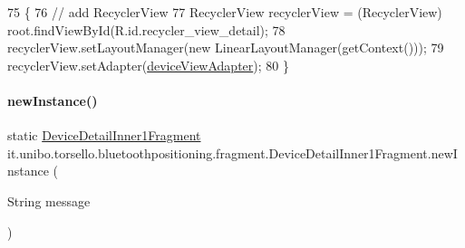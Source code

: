 \begin{DoxyCode}
75                                                    \{
76         \textcolor{comment}{// add RecyclerView}
77         RecyclerView recyclerView = (RecyclerView) root.findViewById(R.id.recycler\_view\_detail);
78         recyclerView.setLayoutManager(\textcolor{keyword}{new} LinearLayoutManager(getContext()));
79         recyclerView.setAdapter(\hyperlink{classit_1_1unibo_1_1torsello_1_1bluetoothpositioning_1_1fragment_1_1DeviceDetailInner1Fragment_ac96cc01fc4f531a4cb38a31cf56e81e9_ac96cc01fc4f531a4cb38a31cf56e81e9}{deviceViewAdapter});
80     \}
\end{DoxyCode}
\hypertarget{classit_1_1unibo_1_1torsello_1_1bluetoothpositioning_1_1fragment_1_1DeviceDetailInner1Fragment_a24fbb536786e1e87e8621b126bd27507_a24fbb536786e1e87e8621b126bd27507}{}\label{classit_1_1unibo_1_1torsello_1_1bluetoothpositioning_1_1fragment_1_1DeviceDetailInner1Fragment_a24fbb536786e1e87e8621b126bd27507_a24fbb536786e1e87e8621b126bd27507} 
\paragraph{\texorpdfstring{new\+Instance()}{newInstance()}}
{\footnotesize\ttfamily static \hyperlink{classit_1_1unibo_1_1torsello_1_1bluetoothpositioning_1_1fragment_1_1DeviceDetailInner1Fragment}{Device\+Detail\+Inner1\+Fragment} it.\+unibo.\+torsello.\+bluetoothpositioning.\+fragment.\+Device\+Detail\+Inner1\+Fragment.\+new\+Instance (\begin{DoxyParamCaption}\item[{String}]{message }\end{DoxyParamCaption})\hspace{0.3cm}{\ttfamily [static]}}


